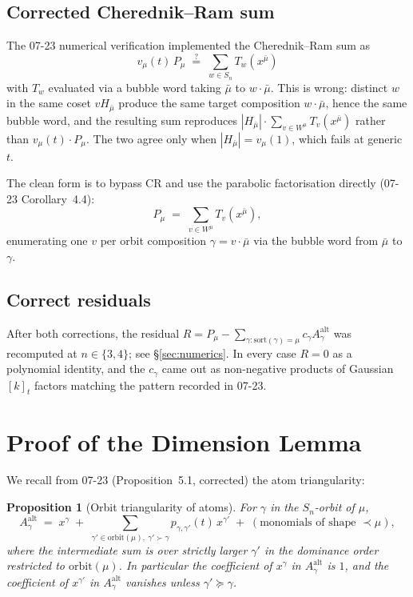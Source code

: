 \documentclass[11pt]{article}
\newtheorem{proposition}[theorem]{Proposition}
\theoremstyle{definition}
\newcommand{\alt}{\mathrm{alt}}
\newcommand{\orbit}{\mathrm{orbit}}
\newcommand{\sort}{\mathrm{sort}}
\newcommand{\barmu}{\bar\mu}
\begin{document}
\subsection{Corrected Cherednik--Ram sum}

The 07-23 numerical verification implemented the Cherednik--Ram sum as
\[
v_\mu(t)\, P_\mu \;\stackrel{?}{=}\; \sum_{w\in S_n} T_w(x^\barmu)
\]
with $T_w$ evaluated via a bubble word taking $\barmu$ to $w\cdot\barmu$.
This is wrong: distinct $w$ in the same coset $vH_\barmu$ produce the
same target composition $w\cdot\barmu$, hence the same bubble word, and
the resulting sum reproduces $|H_\barmu|\cdot\sum_{v\in W^\mu} T_v(x^\barmu)$
rather than $v_\mu(t)\cdot P_\mu$.  The two agree only when $|H_\barmu|
= v_\mu(1)$, which fails at generic $t$.

The clean form is to bypass CR and use the parabolic factorisation
directly (07-23 Corollary~4.4):
\[
P_\mu \;=\; \sum_{v\in W^\mu} T_v(x^\barmu),
\]
enumerating one $v$ per orbit composition $\gamma = v\cdot\barmu$ via the
bubble word from $\barmu$ to $\gamma$.

\subsection{Correct residuals}

After both corrections, the residual
$R = P_\mu - \sum_{\gamma:\sort(\gamma)=\mu} c_\gamma A^\alt_\gamma$
was recomputed at $n\in\{3,4\}$; see \S\ref{sec:numerics}.  In every
case $R=0$ as a polynomial identity, and the $c_\gamma$ came out as
non-negative products of Gaussian $[k]_t$ factors matching the pattern
recorded in 07-23.

\section{Proof of the Dimension Lemma}\label{sec:dim-lemma}

We recall from 07-23 (Proposition~5.1, corrected) the atom triangularity:

\begin{proposition}[Orbit triangularity of atoms]\label{prop:triang}
For $\gamma$ in the $S_n$-orbit of $\mu$,
\[
A^\alt_\gamma \;=\; x^\gamma \;+\;
   \sum_{\gamma'\in \orbit(\mu),\ \gamma' \succ \gamma} p_{\gamma,\gamma'}(t)\, x^{\gamma'}
   \;+\; (\text{monomials of shape } \prec \mu),
\]
where the intermediate sum is over strictly larger $\gamma'$ in the
dominance order restricted to $\orbit(\mu)$.  In particular the
coefficient of $x^\gamma$ in $A^\alt_\gamma$ is $1$, and the coefficient
of $x^{\gamma'}$ in $A^\alt_\gamma$ vanishes unless $\gamma' \succeq \gamma$.
\end{proposition}
\end{document}
